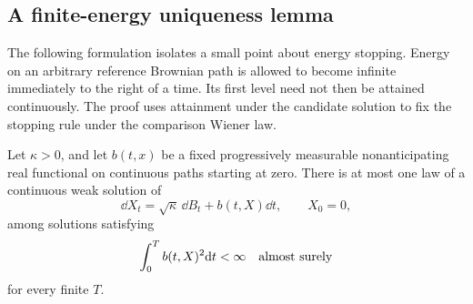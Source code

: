 \subsection{A finite-energy uniqueness lemma}

The following formulation isolates a small point about energy
stopping. Energy on an arbitrary reference Brownian path is allowed
to become infinite immediately to the right of a time. Its first
level need not then be attained continuously. The proof uses
attainment under the candidate solution to fix the stopping rule
under the comparison Wiener law.

\begin{lemma}\label{uni:weak}
Let $\kappa>0$, and let $b(t,x)$ be a fixed progressively measurable
nonanticipating real functional on continuous paths starting at zero.
There is at most one law of a continuous weak solution of
\begin{equation}\label{uni:generic-SDE}
 \dd X_t=\sqrt\kappa\,\dd B_t+b(t,X)\dd t,
 \qquad X_0=0,
\end{equation}
among solutions satisfying
\begin{equation}\label{uni:generic-energy}
 \int_0^T b(t,X)^2\mathrm d t<\infty\quad\hbox{almost surely}
\end{equation}
for every finite $T$.
\end{lemma}

